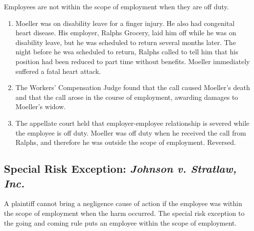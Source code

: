 Employees are not within the scope of employment when they are off duty.

\begin{enumerate}
    \item Moeller was on disability leave for a finger injury. He also had 
    congenital heart disease. His employer, Ralphs Grocery, laid him off while 
    he was on disability leave, but he was scheduled to return several months 
    later. The night before he wsa scheduled to return, Ralphs called to tell 
    him that his position had been reduced to part time without benefits. 
    Moeller immediately suffered a fatal heart attack.
    \item The Workers' Compensation Judge found that the call caused Moeller's death 
    and that the call arose in the course of employment, awarding damages to 
    Moeller's widow.
    \item The appellate court held that employer-employee relationship is 
    severed while the employee is off duty. Moeller was off duty when he 
    received the call from Ralphs, and therefore he was outside the scope of 
    employment. Reversed.
\end{enumerate}

\subsection{Special Risk Exception: \emph{Johnson v. Stratlaw, Inc.}}

A plaintiff cannot bring a negligence cause of action if the employee was 
within the scope of employment when the harm occurred. The special risk 
exception to the going and coming rule puts an employee within the scope of 
employment.

